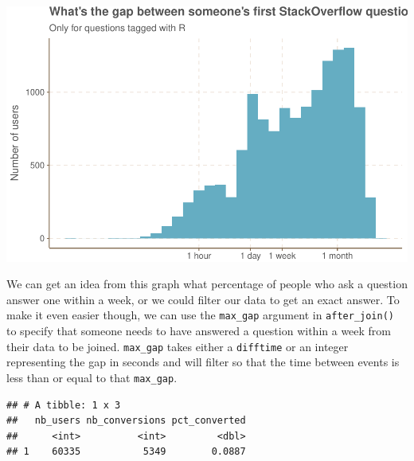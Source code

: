 \documentclass[]{article}
\newenvironment{Shaded}{\begin{snugshade}}{\end{snugshade}}
\newcommand{\KeywordTok}[1]{\textcolor[rgb]{0.13,0.29,0.53}{\textbf{#1}}}
\newcommand{\DataTypeTok}[1]{\textcolor[rgb]{0.13,0.29,0.53}{#1}}
\newcommand{\DecValTok}[1]{\textcolor[rgb]{0.00,0.00,0.81}{#1}}
\newcommand{\StringTok}[1]{\textcolor[rgb]{0.31,0.60,0.02}{#1}}
\newcommand{\OperatorTok}[1]{\textcolor[rgb]{0.81,0.36,0.00}{\textbf{#1}}}
\newcommand{\NormalTok}[1]{#1}
\begin{document}
\includegraphics{2019-07-25-introducing-the-funneljoin-package_files/figure-latex/unnamed-chunk-11-1.pdf}

We can get an idea from this graph what percentage of people who ask a
question answer one within a week, or we could filter our data to get an
exact answer. To make it even easier though, we can use the
\texttt{max\_gap} argument in \texttt{after\_join()} to specify that
someone needs to have answered a question within a week from their data
to be joined. \texttt{max\_gap} takes either a \texttt{difftime} or an
integer representing the gap in seconds and will filter so that the time
between events is less than or equal to that \texttt{max\_gap}.

\begin{Shaded}
\end{Shaded}

\begin{verbatim}
## # A tibble: 1 x 3
##   nb_users nb_conversions pct_converted
##      <int>          <int>         <dbl>
## 1    60335           5349        0.0887
\end{verbatim}
\end{document}
